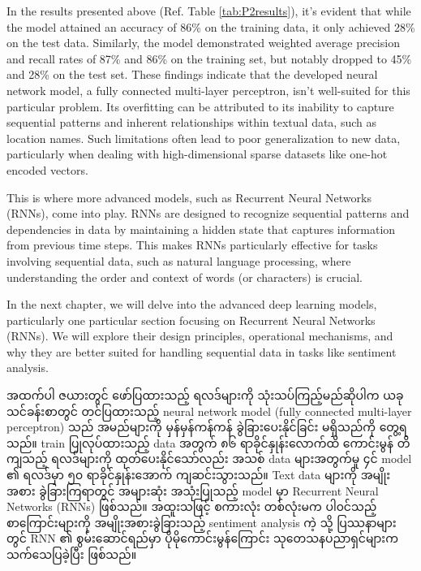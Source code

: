 In the results presented above (Ref. Table \ref{tab:P2results}), it's evident that while the model attained an accuracy of 86\% on the training data, it only achieved 28\% on the test data. Similarly, the model demonstrated weighted average precision and recall rates of 87\% and 86\% on the training set, but notably dropped to 45\% and 28\% on the test set. These findings indicate that the developed neural network model, a fully connected multi-layer perceptron, isn't well-suited for this particular problem. Its overfitting can be attributed to its inability to capture sequential patterns and inherent relationships within textual data, such as location names. Such limitations often lead to poor generalization to new data, particularly when dealing with high-dimensional sparse datasets like one-hot encoded vectors.

This is where more advanced models, such as Recurrent Neural Networks (RNNs), come into play. RNNs are designed to recognize sequential patterns and dependencies in data by maintaining a hidden state that captures information from previous time steps. This makes RNNs particularly effective for tasks involving sequential data, such as natural language processing, where understanding the order and context of words (or characters) is crucial. 


In the next chapter, we will delve into the advanced deep learning models, particularly one particular section focusing on Recurrent Neural Networks (RNNs). We will explore their design principles, operational mechanisms, and why they are better suited for handling sequential data in tasks like sentiment analysis. 

အထက်ပါ ဇယားတွင် ဖော်ပြထားသည့် ရလဒ်များကို သုံးသပ်ကြည့်မည်ဆိုပါက ယခု သင်ခန်းစာတွင် တင်ပြထားသည့် neural network model (fully connected multi-layer perceptron) သည် အမည်များကို မှန်မှန်ကန်ကန် ခွဲခြားပေးနိုင်ခြင်း မရှိသည်ကို တွေ့ရသည်။ train ပြုလုပ်ထားသည့် data အတွက် ၈၆ ရာခိုင်နှုန်းလောက်ထိ ကောင်းမွန် တိကျသည့် ရလဒ်များကို ထုတ်ပေးနိုင်သော်လည်း အသစ် data များအတွက်မူ ၄င် model ၏ ရလဒ်မှာ ၅၀ ရာခိုင်နှုန်းအောက် ကျဆင်းသွားသည်။ Text data များကို အမျိုးအစား ခွဲခြားကြရာတွင် အများဆုံး အသုံးပြုသည့်  model မှာ  Recurrent Neural Networks (RNNs) ဖြစ်သည်။ အထူးသဖြင့် စကားလုံး တစ်လုံးမက ပါ၀င်သည့် စာကြောင်းများကို အမျိုးအစားခွဲခြားသည့် sentiment analysis ကဲ့ သို့ ပြဿနာများတွင် RNN ၏ စွမ်းဆောင်ရည်မှာ ပိုမိုကောင်းမွန်ကြောင်း သုတေသနပညာရှင်များက သက်သေပြခဲ့ပြီး ဖြစ်သည်။ 

